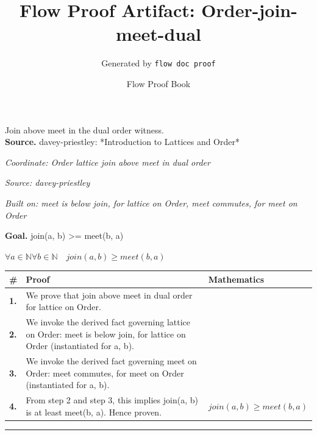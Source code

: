 \documentclass[11pt]{article}
\title{Flow Proof Artifact: Order-join-meet-dual}
\author{Generated by \texttt{flow doc proof}}
\date{Flow Proof Book}
\theoremstyle{definition}
\begin{document}
\maketitle
Join above meet in the dual order witness.\\[0.5em]
\textbf{Source.} davey-priestley: *Introduction to Lattices and Order*\\[0.5em]
\bigskip
{}\par
\smallskip\noindent\textit{Coordinate: Order \cdot lattice \cdot join above meet in dual order}\par
\smallskip\noindent\textit{Source: davey-priestley}\par
\smallskip\noindent\textit{Built on: meet is below join, for lattice on Order, meet commutes, for meet on Order}\par
\medskip
\noindent\textbf{Goal.} join(a, b) >= meet(b, a)\par
\noindent$\displaystyle \forall a \in \mathbb{N} \forall b \in \mathbb{N}\quad join(a, b) \ge meet(b, a)$\par
\medskip
\noindent
\begin{tabular}{@{} >{\raggedright\arraybackslash}p{} >{\raggedright\arraybackslash}p{} >{\raggedleft\arraybackslash}p{} @{}}
\textbf{\#} & \textbf{Proof} & \textbf{Mathematics} \\
\midrule
\textbf{1.} & We prove that join above meet in dual order for lattice on Order. & \\[0.45em]
\textbf{2.} & We invoke the derived fact governing lattice on Order: meet is below join, for lattice on Order (instantiated for a, b). & \\[0.45em]
\textbf{3.} & We invoke the derived fact governing meet on Order: meet commutes, for meet on Order (instantiated for a, b). & \\[0.45em]
\textbf{4.} & From step 2 and step 3, this implies join(a, b) is at least meet(b, a). Hence proven. & $\displaystyle join(a, b) \ge meet(b, a)$ \\[0.45em]
\bottomrule
\end{tabular}
\label{thm:Order-lattice-join_above_meet_in_dual_order}
\par\medskip\hrule
\end{document}
